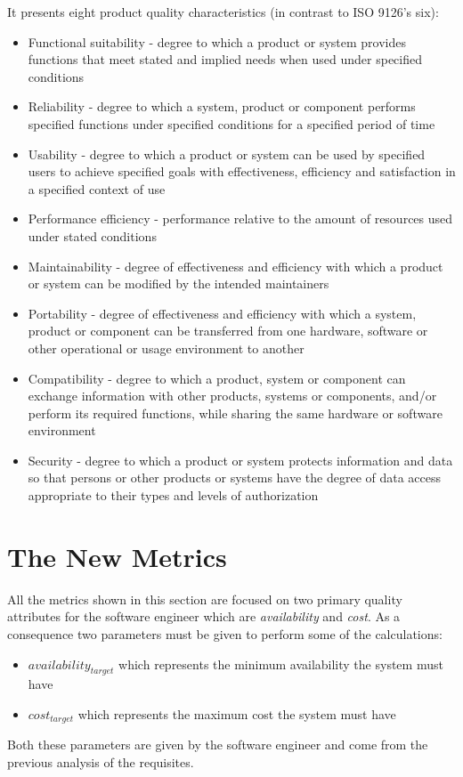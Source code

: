 It presents eight product quality characteristics (in contrast to ISO 9126's six):
\begin{itemize}
	\item Functional suitability - degree to which a product or system provides functions that meet stated and implied needs when used under specified conditions
	\item Reliability - degree to which a system, product or component performs specified functions under specified conditions for a specified period of time
	\item Usability - degree to which a product or system can be used by specified users to achieve specified goals with effectiveness, efficiency and satisfaction in a specified context of use
	\item Performance efficiency - performance relative to the amount of resources used under stated conditions
	\item Maintainability - degree of effectiveness and efficiency with which a product or system can be modified by the intended maintainers
	\item Portability - degree of effectiveness and efficiency with which a system, product or component can be transferred from one hardware, software or other operational or usage environment to another
	\item Compatibility - degree to which a product, system or component can exchange information with other products, systems or components, and/or perform its required functions, while sharing the same hardware or software environment
	\item Security - degree to which a product or system protects information and data so that persons or other products or systems have the degree of data access appropriate to their types and levels of authorization
\end{itemize}

\section{The New Metrics}
\label{sec:new-metrics}
All the metrics shown in this section are focused on two primary quality attributes for the software engineer which are \emph{availability} and \emph{cost}. As a consequence two parameters must be given to perform some of the calculations:
\begin{itemize}
	\item \emph{$availability_{target}$} which represents the minimum availability the system must have
	\item \emph{$cost_{target}$} which represents the maximum cost the system must have
\end{itemize}
Both these parameters are given by the software engineer and come from the previous analysis of the requisites.

